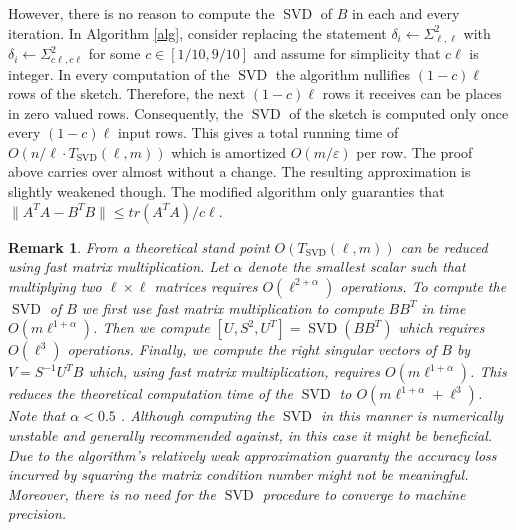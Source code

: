 \documentclass[]{article}
\newcommand{\SVD}{\operatorname{SVD}}
\newcommand{\eps}{\varepsilon}
\newtheorem{remark}{Remark}
\begin{document}
However, there is no reason to compute the $\SVD$ of $B$ in each and every iteration.
In Algorithm \ref{alg}, consider replacing the statement 
$\delta_i \leftarrow \Sigma_{\ell,\ell}^2$ with $\delta_i \leftarrow \Sigma_{c\ell,c\ell}^2$
for some $c \in [1/10,9/10]$ and assume for simplicity that $c\ell$ is integer.
In every computation of the $\SVD$ the algorithm nullifies $(1-c)\ell$ rows of the sketch.
Therefore, the next $(1-c)\ell$ rows it receives can be places in zero valued rows.
Consequently, the $\SVD$ of the sketch is computed only once every $(1-c)\ell$ input rows.
This gives a total running time of $O(n/\ell \cdot T_{\SVD}(\ell,m))$ which is amortized $O(m/\eps)$ per row.
The proof above carries over almost without a change. The resulting approximation is slightly weakened though.
The modified algorithm only guaranties that $\|A^{T}A - B^{T}B\| \le tr(A^{T}A)/c\ell$.


\begin{remark}
From a theoretical stand point $O(T_{\SVD}(\ell,m))$ can be reduced using fast matrix multiplication.
Let $\alpha$ denote the smallest scalar such that multiplying two $\ell \times \ell$ matrices requires $O(\ell^{2+\alpha})$ operations.
To compute the $\SVD$ of $B$ we first use fast matrix multiplication to compute $BB^T$ in time $O(m\ell^{1+\alpha})$.
Then we compute $[U,S^2,U^{T}] = \SVD(BB^T)$ which requires $O(\ell^3)$ operations.
Finally, we compute the right singular vectors of $B$ by $V = S^{-1}U^{T}B$ which, using fast matrix multiplication, requires $O(m\ell^{1+\alpha})$. This reduces the theoretical computation time of the $\SVD$ to $O(m \ell^{1+\alpha} + \ell^3)$. 
Note that $\alpha < 0.5$ \cite{CohnKSU05}.
Although computing the $\SVD$ in this manner is numerically unstable and generally recommended against, 
in this case it might be beneficial.
Due to the algorithm's relatively weak approximation guaranty the accuracy loss incurred by squaring the matrix condition number might not be meaningful.
Moreover, there is no need for the $\SVD$ procedure to converge to machine precision. 

\end{remark}
\end{document}
